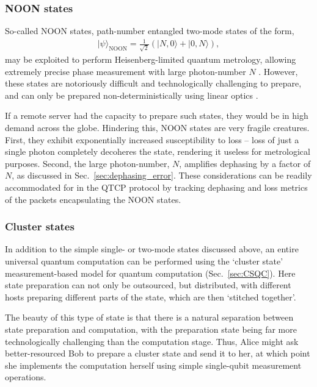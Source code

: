 \documentclass[aps,rmp,twocolumn,amsmath,amssymb,nofootinbib,superscriptaddress]{revtex4}
\newcommand{\ket}[1]{|#1\rangle}
\begin{document}
%
%

\subsubsection{NOON states} \label{sec:NOON}

So-called NOON states, path-number entangled two-mode states of the form,
\begin{align}
\ket\psi_\mathrm{NOON} = \frac{1}{\sqrt{2}}(\ket{N,0}+\ket{0,N}),
\end{align}
may be exploited to perform Heisenberg-limited quantum metrology, allowing extremely precise phase measurement with large photon-number $N$ \cite{bib:Dowling08}. However, these states are notoriously difficult and technologically challenging to prepare, and can only be prepared non-deterministically using linear optics \cite{bib:Cable07}.

If a remote server had the capacity to prepare such states, they would be in high demand across the globe. Hindering this, NOON states are very fragile creatures. First, they exhibit exponentially increased susceptibility to loss -- loss of just a single photon completely decoheres the state, rendering it useless for metrological purposes. Second, the large photon-number, $N$, amplifies dephasing by a factor of $N$, as discussed in Sec.~\ref{sec:dephasing_error}. These considerations can be readily accommodated for in the QTCP protocol by tracking dephasing and loss metrics of the packets encapsulating the NOON states.

%
%

\subsubsection{Cluster states}

In addition to the simple single- or two-mode states discussed above, an entire universal quantum computation can be performed using the `cluster state' measurement-based model for quantum computation (Sec.~\ref{sec:CSQC}). Here state preparation can not only be outsourced, but distributed, with different hosts preparing different parts of the state, which are then `stitched together'.

The beauty of this type of state is that there is a natural separation between state preparation and computation, with the preparation state being far more technologically challenging than the computation stage. Thus, Alice might ask better-resourced Bob to prepare a cluster state and send it to her, at which point she implements the computation herself using simple single-qubit measurement operations.
\end{document}
